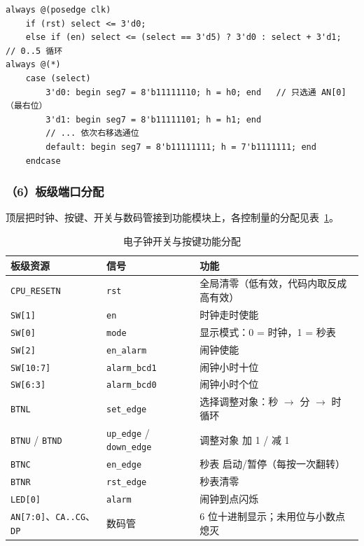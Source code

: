 \documentclass[12pt, a4paper]{ctexart}
\begin{document}
\begin{lstlisting}
always @(posedge clk)
    if (rst) select <= 3'd0;
    else if (en) select <= (select == 3'd5) ? 3'd0 : select + 3'd1;   // 0..5 循环
always @(*)
    case (select)
        3'd0: begin seg7 = 8'b11111110; h = h0; end   // 只选通 AN[0]（最右位）
        3'd1: begin seg7 = 8'b11111101; h = h1; end
        // ... 依次右移选通位
        default: begin seg7 = 8'b11111111; h = 7'b1111111; end
    endcase
\end{lstlisting}

\subsubsection*{（6）板级端口分配}
顶层把时钟、按键、开关与数码管接到功能模块上，各控制量的分配见表~\ref{tab:ctrl}。

\begin{table}[htbp]
    \centering
    \caption{电子钟开关与按键功能分配}
    \label{tab:ctrl}
    \begin{tabular}{lll}
        \hline
        板级资源 & 信号 & 功能 \\
        \hline
        \texttt{CPU\_RESETN} & \texttt{rst} & 全局清零（低有效，代码内取反成高有效）\\
        \texttt{SW[1]}  & \texttt{en}        & 时钟走时使能 \\
        \texttt{SW[0]}  & \texttt{mode}      & 显示模式：0 = 时钟，1 = 秒表 \\
        \texttt{SW[2]}  & \texttt{en\_alarm} & 闹钟使能 \\
        \texttt{SW[10:7]} & \texttt{alarm\_bcd1} & 闹钟小时十位 \\
        \texttt{SW[6:3]}  & \texttt{alarm\_bcd0} & 闹钟小时个位 \\
        \texttt{BTNL} & \texttt{set\_edge}  & 选择调整对象：秒 $\to$ 分 $\to$ 时 循环 \\
        \texttt{BTNU} / \texttt{BTND} & \texttt{up\_edge} / \texttt{down\_edge} & 调整对象 加 1 / 减 1 \\
        \texttt{BTNC} & \texttt{en\_edge}   & 秒表 启动/暂停（每按一次翻转）\\
        \texttt{BTNR} & \texttt{rst\_edge}  & 秒表清零 \\
        \texttt{LED[0]} & \texttt{alarm}    & 闹钟到点闪烁 \\
        \texttt{AN[7:0]}、\texttt{CA..CG}、\texttt{DP} & 数码管 & 6 位十进制显示；未用位与小数点熄灭 \\
        \hline
    \end{tabular}
\end{table}
\end{document}
